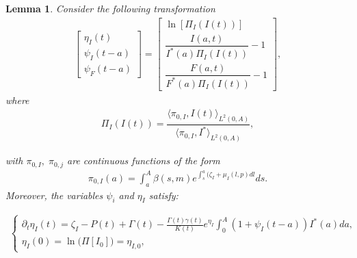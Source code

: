 \documentclass[10pt, a4paper]{amsart}
\theoremstyle{plain}
\newtheorem{lemma}{Lemma}[section]
\theoremstyle{definition}
\theoremstyle{remark}
\numberwithin{equation}{section}
\begin{document}
\begin{lemma}\label{le3.4}
Consider the following transformation
\begin{align}\label{e3.52}
 \left[\begin{array}{c}
\eta_I(t) \\ 
\psi_I(t-a)\\
\psi_F(t-a)
\end{array}  \right]=\left[\begin{array}{c}
\ln[\Pi_I(I(t))] \\ 
\dfrac{I(a,t)}{I^*(a)\Pi_I(I(t))}-1\\
\dfrac{F(a,t)}{F^*(a)\Pi_I(I(t))}-1
\end{array} \right],%
\end{align}
where
\begin{align}\label{e3.53}
\Pi_I(I(t))=\dfrac{\langle \pi_{0,I}, I(t)\rangle_{L^2(0,A)}}{\langle\pi_{0,I}, I^*\rangle_{L^2(0,A)}},%
\end{align}

with  $\pi_{0,I},\; \pi_{0,j}$ are continuous functions of the form
\begin{align}\label{e3.54}
   \pi_{0,I}(a)= \displaystyle\int_a^{A}\beta(s,m)e^{\int_s^a(\zeta_I+\mu_I(l,p)dl}ds.%
\end{align}
Moreover, the variables $\psi_i$ and $\eta_I$ satisfy:

\begin{align}\label{e3.55}
\begin{cases}
    \partial_t\eta_I(t)=\zeta_I-P(t)+\Gamma(t)-\frac{\Gamma(t)\gamma(t)}{K(t)}e^{\eta_I}\displaystyle\int_{0}^A (1+\psi_I(t-a))I^*(a)da,\\
\eta_{I}(0)
= \ln\!\bigl(\Pi[I_{0}]\bigr)
= \eta_{I,0},
\end{cases}
\end{align}



\end{lemma}
\end{document}
